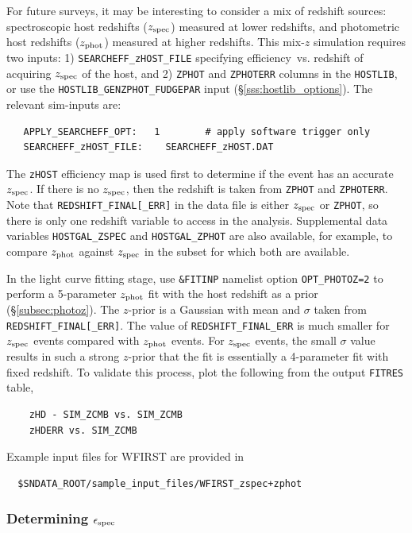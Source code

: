 \documentclass[12pt]{article}
\newcommand{\Zphot}{z_{\rm phot}}
\newcommand{\Zspec}{z_{\rm spec}}
\newcommand{\eff}{efficiency}
\newcommand{\simeffspec}{\epsilon_{\rm spec}}
\begin{document}
{For future surveys, it may be interesting to consider a mix of redshift sources:
spectroscopic host redshifts ($\Zspec$) measured at lower redshifts, 
and photometric host redshifts ($\Zphot$) measured at higher redshifts.
This mix-$z$ simulation requires two inputs: 1) {\tt SEARCHEFF\_zHOST\_FILE} 
specifying \eff\ vs. redshift of acquiring $\Zspec$ of the host, and
2) {\tt ZPHOT} and {\tt ZPHOTERR} columns in the {\tt HOSTLIB}, or use the
{\tt HOSTLIB\_GENZPHOT\_FUDGEPAR} input (\S\ref{sss:hostlib_options}).
The relevant sim-inputs are:
%
\begin{Verbatim}
   APPLY_SEARCHEFF_OPT:   1        # apply software trigger only
   SEARCHEFF_zHOST_FILE:    SEARCHEFF_zHOST.DAT
\end{Verbatim}
%
The {\tt zHOST} efficiency map is used first to determine if the event has an accurate $\Zspec$.
If there is no $\Zspec$, then the redshift is taken from {\tt ZPHOT} and {\tt ZPHOTERR}.
Note that {\tt REDSHIFT\_FINAL[\_ERR]} in the data file is either $\Zspec$ or {\tt ZPHOT},
so there is only one redshift variable to access in the analysis. Supplemental data variables
{\tt HOSTGAL\_ZSPEC} and {\tt HOSTGAL\_ZPHOT} are also available, for example,
to compare $\Zphot$ against $\Zspec$ in the subset for which both are available.

In the light curve fitting stage, use {\tt \&FITINP} namelist option  {\tt OPT\_PHOTOZ=2}
to perform a  5-parameter $\Zphot$ fit with the host redshift as a prior (\S\ref{subsec:photoz}).
The $z$-prior is a Gaussian with mean and $\sigma$ taken from {\tt REDSHIFT\_FINAL[\_ERR]}. 
The value of  {\tt REDSHIFT\_FINAL\_ERR} is much smaller for $\Zspec$
events compared with $\Zphot$ events. For $\Zspec$ events, the small $\sigma$ value
results in such a strong $z$-prior that the fit is essentially a 4-parameter fit with fixed redshift.
To validate this process, plot the following
from the output {\tt FITRES} table,
\begin{Verbatim}
    zHD - SIM_ZCMB vs. SIM_ZCMB
    zHDERR vs. SIM_ZCMB
\end{Verbatim}

\medskip
\noindent Example input files for WFIRST are provided in
\vspace{-0.2cm}
\begin{Verbatim}
  $SNDATA_ROOT/sample_input_files/WFIRST_zspec+zphot 
\end{Verbatim}

   \subsubsection{Determining $\simeffspec$}
   \label{sssec:simeffspec}

}
\end{document}
